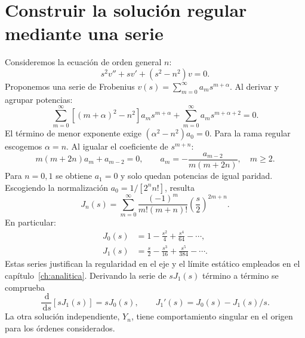 \documentclass[11pt,a4paper]{report}
\numberwithin{equation}{chapter}
\newcommand{\dd}{\,\mathrm{d}}
\begin{document}
\section{Construir la soluci\'on regular mediante una serie}
Consideremos la ecuaci\'on de orden general $n$:
\begin{equation}
 s^2v''+sv'+(s^2-n^2)v=0.
\end{equation}
Proponemos una serie de Frobenius
$v(s)=\sum_{m=0}^{\infty}a_m s^{m+\alpha}$.
Al derivar y agrupar potencias:
\begin{equation}
 \sum_{m=0}^{\infty}[(m+\alpha)^2-n^2]a_ms^{m+\alpha}
 +\sum_{m=0}^{\infty}a_ms^{m+\alpha+2}=0.
\end{equation}
El t\'ermino de menor exponente exige
$(\alpha^2-n^2)a_0=0$.
Para la rama regular escogemos $\alpha=n$.
Al igualar el coeficiente de $s^{m+n}$:
\begin{equation}
 m(m+2n)a_m+a_{m-2}=0,\qquad
 a_m=-\frac{a_{m-2}}{m(m+2n)},\quad m\ge2.
\end{equation}
Para $n=0,1$ se obtiene $a_1=0$ y solo quedan potencias de igual
paridad. Escogiendo la normalizaci\'on
$a_0=1/[2^n n!]$, resulta
\begin{equation}
 J_n(s)=\sum_{m=0}^{\infty}
 \frac{(-1)^m}{m!(m+n)!}\left(\frac{s}{2}\right)^{2m+n}.
\end{equation}
En particular:
\begin{align}
 J_0(s)&=1-\frac{s^2}{4}+\frac{s^4}{64}-\cdots,\\
 J_1(s)&=\frac{s}{2}-\frac{s^3}{16}+\frac{s^5}{384}-\cdots.
\end{align}
Estas series justifican la regularidad en el eje y el l\'imite
est\'atico empleados en el cap\'itulo~\ref{ch:analitica}.
Derivando la serie de $sJ_1(s)$ t\'ermino a t\'ermino se comprueba
\begin{equation}
 \frac{\dd}{\dd s}[sJ_1(s)]=sJ_0(s),
 \qquad J_1'(s)=J_0(s)-J_1(s)/s.
\end{equation}
La otra soluci\'on independiente, $Y_n$, tiene comportamiento singular
en el origen para los \'ordenes considerados.
\end{document}
